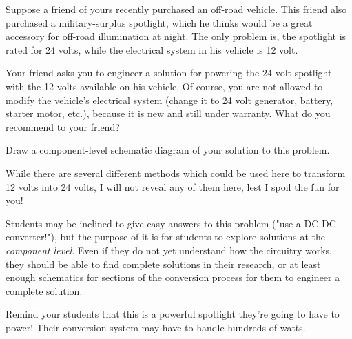 

Suppose a friend of yours recently purchased an off-road vehicle.  This friend also purchased a military-surplus spotlight, which he thinks would be a great accessory for off-road illumination at night.  The only problem is, the spotlight is rated for 24 volts, while the electrical system in his vehicle is 12 volt.

Your friend asks you to engineer a solution for powering the 24-volt spotlight with the 12 volts available on his vehicle.  Of course, you are not allowed to modify the vehicle's electrical system (change it to 24 volt generator, battery, starter motor, etc.), because it is new and still under warranty.  What do you recommend to your friend?

Draw a component-level schematic diagram of your solution to this problem.







While there are several different methods which could be used here to transform 12 volts into 24 volts, I will not reveal any of them here, lest I spoil the fun for you!







Students may be inclined to give easy answers to this problem ("use a DC-DC converter!"), but the purpose of it is for students to explore solutions at the {\it component level}.  Even if they do not yet understand how the circuitry works, they should be able to find complete solutions in their research, or at least enough schematics for sections of the conversion process for them to engineer a complete solution.

Remind your students that this is a powerful spotlight they're going to have to power!  Their conversion system may have to handle hundreds of watts.




